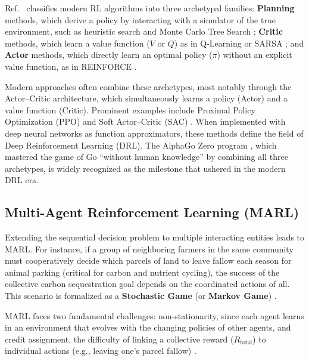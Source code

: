 \documentclass[conference]{IEEEtran}
\begin{document}
Ref.~\cite{gautronReinforcementLearningCrop2022} classifies modern RL algorithms into three archetypal families: \textbf{Planning} methods, which derive a policy by interacting with a simulator of the true environment, such as heuristic search and Monte Carlo Tree Search \cite{suttonReinforcementLearningIntroduction2014, kocsisImprovedMontecarloSearch}; \textbf{Critic} methods, which learn a value function ($V$ or $Q$) as in Q-Learning or SARSA \cite{watkinsQlearning1992, suttonReinforcementLearningIntroduction2014}; and \textbf{Actor} methods, which directly learn an optimal policy ($\pi$) without an explicit value function, as in REINFORCE \cite{williamsSimpleStatisticalGradientfollowing1992}.

Modern approaches often combine these archetypes, most notably through the Actor–Critic architecture, which simultaneously learns a policy (Actor) and a value function (Critic). Prominent examples include Proximal Policy Optimization (PPO) and Soft Actor–Critic (SAC) \cite{haarnojaSoftActorCriticOffPolicy2018, schulmanProximalPolicyOptimization2017}. When implemented with deep neural networks as function approximators, these methods define the field of Deep Reinforcement Learning (DRL). The AlphaGo Zero program \cite{silverMasteringGameGo2017}, which mastered the game of Go “without human knowledge” by combining all three archetypes, is widely recognized as the milestone that ushered in the modern DRL era.

\subsection{Multi-Agent Reinforcement Learning (MARL)}

Extending the sequential decision problem to multiple interacting entities leads to MARL. For instance, if a group of neighboring farmers in the same community must cooperatively decide which parcels of land to leave fallow each season for animal parking (critical for carbon and nutrient cycling), the success of the collective carbon sequestration goal depends on the coordinated actions of all. This scenario is formalized as a \textbf{Stochastic Game} (or \textbf{Markov Game}) \cite{littmanMarkovGamesFramework1994}.

MARL faces two fundamental challenges: non-stationarity, since each agent learns in an environment that evolves with the changing policies of other agents, and credit assignment, the difficulty of linking a collective reward ($R_{\text{total}}$) to individual actions (e.g., leaving one’s parcel fallow) \cite{perolatMultiagentReinforcementLearning2017}.
\end{document}
